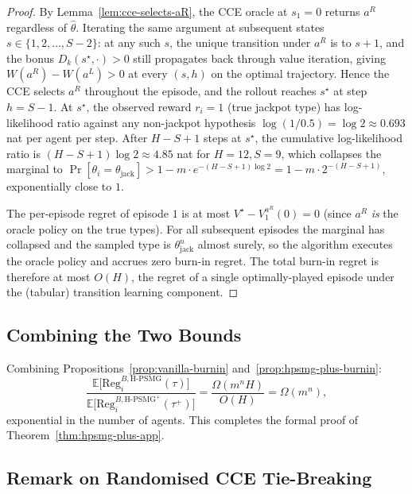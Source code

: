 \begin{proof}
By Lemma~\ref{lem:cce-selects-aR}, the CCE oracle at $s_1 = 0$ returns $a^R$ regardless of $\hat\theta$. Iterating the same argument at subsequent states $s \in \{1, 2, \ldots, S-2\}$: at any such $s$, the unique transition under $a^R$ is to $s+1$, and the bonus $D_k(s^\star, \cdot) > 0$ still propagates back through value iteration, giving $W(a^R) - W(a^L) > 0$ at every $(s, h)$ on the optimal trajectory. Hence the CCE selects $a^R$ throughout the episode, and the rollout reaches $s^\star$ at step $h = S - 1$. At $s^\star$, the observed reward $r_i = 1$ (true jackpot type) has log-likelihood ratio against any non-jackpot hypothesis $\log(1 / 0.5) = \log 2 \approx 0.693$ nat per agent per step. After $H - S + 1$ steps at $s^\star$, the cumulative log-likelihood ratio is $(H - S + 1) \log 2 \approx 4.85$ nat for $H = 12, S = 9$, which collapses the marginal to $\Pr[\theta_i = \theta_{\mathrm{jack}}] > 1 - m \cdot e^{-(H-S+1)\log 2} = 1 - m \cdot 2^{-(H-S+1)}$, exponentially close to $1$.

The per-episode regret of episode $1$ is at most $V^\star - V^{a^R}_1(0) = 0$ (since $a^R$ \emph{is} the oracle policy on the true types). For all subsequent episodes the marginal has collapsed and the sampled type is $\theta_{\mathrm{jack}}^n$ almost surely, so the algorithm executes the oracle policy and accrues zero burn-in regret. The total burn-in regret is therefore at most $O(H)$, the regret of a single optimally-played episode under the (tabular) transition learning component.
\end{proof}

\subsection{Combining the Two Bounds}
\label{app:hpsmg-plus-combine}

Combining Propositions~\ref{prop:vanilla-burnin} and~\ref{prop:hpsmg-plus-burnin}:
\begin{equation}
\frac{\mathbb{E}\big[\mathrm{Reg}_i^{B, \text{H-PSMG}}(\tau)\big]}{\mathbb{E}\big[\mathrm{Reg}_i^{B, \text{H-PSMG}^+}(\tau^+)\big]} = \frac{\Omega(m^n H)}{O(H)} = \Omega(m^n),
\end{equation}
exponential in the number of agents. This completes the formal proof of Theorem~\ref{thm:hpsmg-plus-app}.

\subsection{Remark on Randomised CCE Tie-Breaking}

